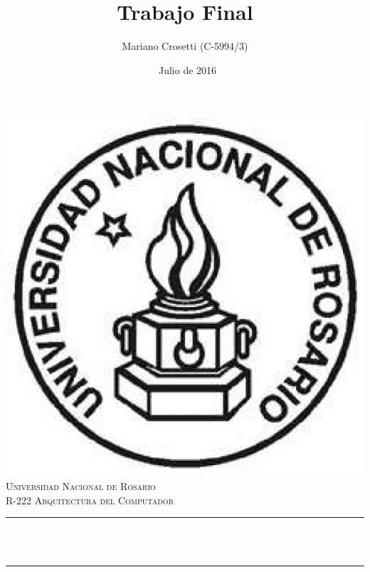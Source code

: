 \documentclass[12pt]{article}
\title{Trabajo Final}					%
\author{Mariano Crosetti (C-5994/3)}					%
\date{\ Julio de 2016}						%
\makeatletter
\let\thetitle\@title
\let\theauthor\@author
\makeatother
\begin{document}

\begin{titlepage}
	\centering
    \vspace*{0.0 cm}
    \includegraphics[scale = 0.3]{./imagenes/unr.jpg}\\[1 cm]	%
%
    \textsc{\LARGE Universidad Nacional de Rosario}\\[2.0 cm]	%

	\textsc{\large R-222 Arquitectura del Computador}\\[0.5 cm]		%
	\rule{\linewidth}{0.2 mm} \\[0.4 cm]
	{ \huge \bfseries \thetitle}\\
	\rule{\linewidth}{0.2 mm} \\[1.5 cm]
	
	\begin{minipage}{0.4\textwidth}
		\begin{center} \large
			\theauthor\linebreak
			\end{center}
	\end{minipage}\\[2 cm]
	
 
	\vfill
	
\end{titlepage}
\end{document}
